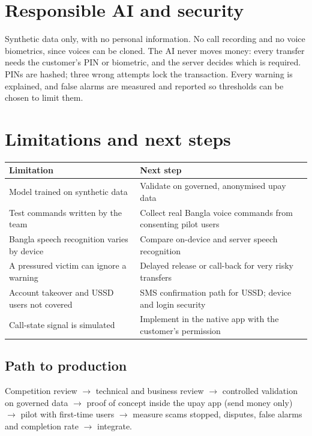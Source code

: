 \documentclass[11pt,a4paper]{article}
\begin{document}
\section{Responsible AI and security}

Synthetic data only, with no personal information. No call recording and no voice biometrics, since voices can be cloned. The AI never moves money: every transfer needs the customer's PIN or biometric, and the server decides which is required. PINs are hashed; three wrong attempts lock the transaction. Every warning is explained, and false alarms are measured and reported so thresholds can be chosen to limit them.

\section{Limitations and next steps}

\begin{tabularx}{\textwidth}{@{}>{\raggedright\arraybackslash}X >{\raggedright\arraybackslash}X@{}}
\toprule
\sffamily\small Limitation & \sffamily\small Next step\\
\midrule
Model trained on synthetic data & Validate on governed, anonymised upay data\\
Test commands written by the team & Collect real Bangla voice commands from consenting pilot users\\
Bangla speech recognition varies by device & Compare on-device and server speech recognition\\
A pressured victim can ignore a warning & Delayed release or call-back for very risky transfers\\
Account takeover and USSD users not covered & SMS confirmation path for USSD; device and login security\\
Call-state signal is simulated & Implement in the native app with the customer's permission\\
\bottomrule
\end{tabularx}

\subsection{Path to production}
Competition review $\rightarrow$ technical and business review $\rightarrow$ controlled validation on governed data $\rightarrow$ proof of concept inside the upay app (send money only) $\rightarrow$ pilot with first-time users $\rightarrow$ measure scams stopped, disputes, false alarms and completion rate $\rightarrow$ integrate.
\end{document}
